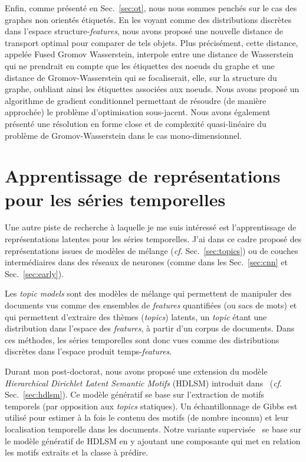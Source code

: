 \haveabreak{}

Enfin, comme présenté en Sec.~\ref{sec:ot}, nous nous sommes penchés sur le cas
des graphes non orientés étiquetés.
En les voyant comme des distributions discrètes dans l'espace
structure-\emph{features}, nous avons proposé une nouvelle distance de transport
optimal pour comparer de tels objets.
Plus précisément, cette distance, appelée
Fused Gromov Wasserstein, interpole entre une distance de Wasserstein qui ne
prendrait en compte que les étiquettes des noeuds du graphe et une distance de
Gromov-Wasserstein qui se focaliserait, elle, sur la structure du graphe,
oubliant ainsi les étiquettes associées aux noeuds.
Nous avons proposé un algorithme de gradient conditionnel permettant
de résoudre (de manière approchée) le problème d'optimisation sous-jacent.
Nous avons également présenté une résolution en forme close et de complexité
quasi-linéaire du problème de Gromov-Wasserstein dans le cas mono-dimensionnel.

\section*{Apprentissage de représentations pour les séries temporelles}

Une autre piste de recherche à laquelle je me suis intéressé est
l'apprentissage de représentations latentes pour les séries temporelles.
J'ai dans ce cadre proposé des représentations issues de
modèles de mélange (\emph{cf.} Sec.~\ref{sec:topics}) ou de couches
intermédiaires dans des réseaux de neurones (comme dans les
Sec.~\ref{sec:cnn} et Sec.~\ref{sec:early}).

\haveabreak{}

Les \emph{topic models} sont des modèles de mélange qui permettent de manipuler
des documents vus comme des ensembles de \emph{features} quantifiées (ou sacs de
mots) et qui permettent d'extraire des thèmes (\emph{topics}) latents, un
\emph{topic} étant une distribution dans l'espace des \emph{features}, à partir
d'un corpus de documents.
Dans ces méthodes, les séries temporelles sont donc vues comme des
distributions discrètes dans l'espace produit temps-\emph{features}.

Durant mon post-doctorat, nous avons proposé une extension du modèle
\emph{Hierarchical Dirichlet Latent Semantic Motifs}
(HDLSM) introduit dans~\cite{EmonetCVPR2011} (\emph{cf.} Sec.~\ref{sec:hdlsm}).
Ce modèle génératif se base sur l'extraction de motifs temporels
(par opposition aux \emph{topics} statiques).
Un échantillonnage de Gibbs est utilisé pour estimer à la fois le contenu des
motifs (de nombre inconnu) et leur localisation temporelle dans les documents.
Notre variante supervisée~\cite{tavenard:hal-00872048} se base sur le modèle
génératif de HDLSM en y ajoutant une composante qui met en relation les motifs
extraits et la classe à prédire.

